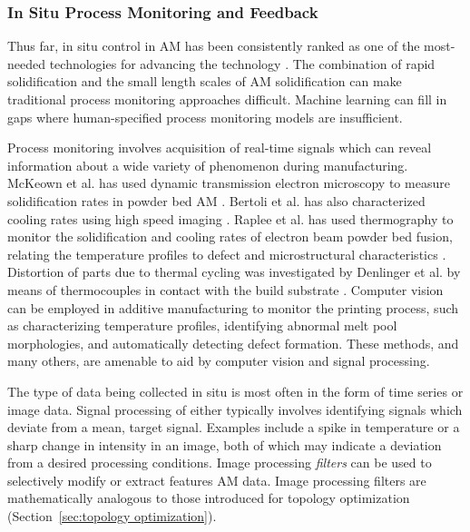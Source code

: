 \subsubsection{In Situ Process Monitoring and Feedback}

Thus far, in situ control in AM has been consistently ranked as one of the most-needed technologies for advancing the technology \cite{Berumen2010, Tapia2014, Mani2017}. The combination of rapid solidification and the small length scales of AM solidification can make traditional process monitoring approaches difficult. Machine learning can fill in gaps where human-specified process monitoring models are insufficient.

Process monitoring involves acquisition of real-time signals which can reveal information about a wide variety of phenomenon during manufacturing. McKeown et al. has used dynamic transmission electron microscopy to measure solidification rates in powder bed AM \cite{McKeown2016}. Bertoli et al. has also characterized cooling rates using high speed imaging \cite{Bertoli2017}. Raplee et al. has used thermography to monitor the solidification and cooling rates of electron beam powder bed fusion, relating the temperature profiles to defect and microstructural characteristics \cite{Raplee2017}. Distortion of parts due to thermal cycling was investigated by Denlinger et al. by means of thermocouples in contact with the build substrate \cite{Denlinger2015}. Computer vision can be employed in additive manufacturing to monitor the printing process, such as characterizing temperature profiles, identifying abnormal melt pool morphologies, and automatically detecting defect formation. These methods, and many others, are amenable to aid by computer vision and signal processing. 

The type of data being collected in situ is most often in the form of time series or image data. Signal processing of either typically involves identifying signals which deviate from a mean, target signal. Examples include a spike in temperature or a sharp change in intensity in an image, both of which may indicate a deviation from a desired processing conditions. Image processing \textit{filters} can be used to selectively modify or extract features AM data. Image processing filters are mathematically analogous to those introduced for topology optimization (Section~\ref{sec:topology optimization}).

